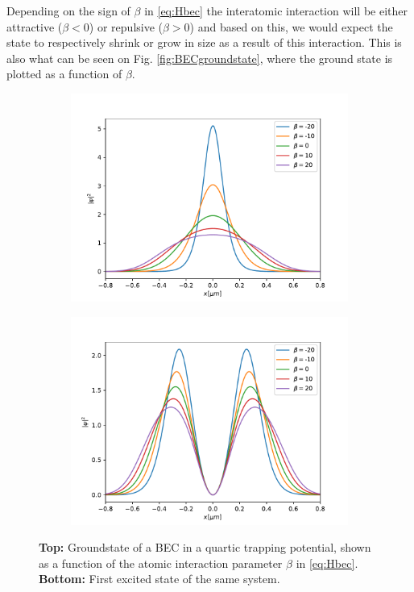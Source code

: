 \documentclass[a4paper, twocolumn]{revtex4-1}
\begin{document}
Depending on the sign of $\beta$ in \eqref{eq:Hbec} the interatomic interaction will be either attractive ($\beta<0$) or repulsive ($\beta>0$) and based on this, we would expect the state to respectively shrink or grow in size as a result of this interaction. This is also what can be seen on Fig. \ref{fig:BECgroundstate}, where the ground state is plotted as a function of $\beta$.
\begin{figure}[h]
	\begin{subfigure}{\columnwidth}
		\includegraphics[width=\columnwidth]{graphics/stateAnalysis/GroundstateBeta.pdf}
	\end{subfigure}
	\begin{subfigure}{\columnwidth}
		\includegraphics[width=\columnwidth]{graphics/stateAnalysis/ExcitedstateBeta.pdf}
	\end{subfigure}
	\caption{\textbf{Top:} Groundstate of a BEC in a quartic trapping potential, shown as a function of the atomic interaction parameter $\beta$ in \ref{eq:Hbec}. \textbf{Bottom:} First excited state of the same system.}
	\label{fig:BECstates}
\end{figure}
\end{document}
